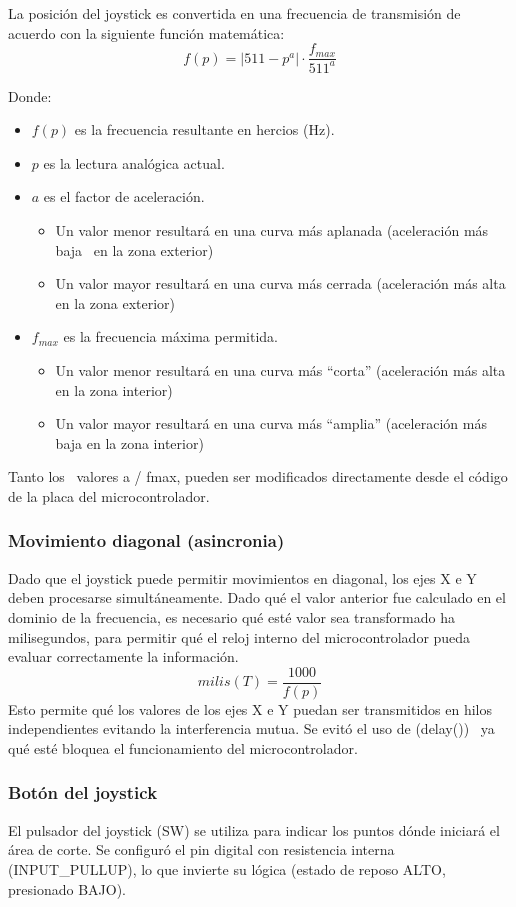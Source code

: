 \documentclass[conference]{IEEEtran}
\begin{document}
    
La posición del joystick es convertida en una frecuencia de transmisión de acuerdo con la siguiente función matemática:
$$f(p) = |511 - p^a| \cdot \frac{f_{max}}{511^a} $$

Donde:
\begin{itemize}
  \item $f(p)$ es la frecuencia resultante en hercios (Hz).
  \item $p$ es la lectura analógica actual.
  \item $a$ es el factor de aceleración.
    \begin{itemize}
      \item Un valor menor resultará en una curva más aplanada (aceleración más baja  en la zona exterior)
      \item Un valor mayor resultará en una curva más cerrada (aceleración más alta en la zona exterior)
    \end{itemize}
  \item $f_{max}$ es la frecuencia máxima permitida.
 \begin{itemize}
      \item Un valor menor resultará en una curva más ``corta'' (aceleración más alta en la zona interior)
      \item Un valor mayor resultará en una curva más ``amplia'' (aceleración más baja en la zona interior)
    \end{itemize}
  \end{itemize}

  Tanto los  valores a / fmax, pueden ser modificados directamente desde el código de la placa del microcontrolador. 

    \subsubsection{Movimiento diagonal (asincronia)}
    Dado que el joystick puede permitir movimientos en diagonal, los ejes X e Y deben procesarse simultáneamente. Dado qué el valor anterior fue calculado en el dominio de la frecuencia, es necesario qué esté valor sea transformado ha milisegundos, para permitir qué el reloj interno del microcontrolador pueda evaluar correctamente la información.
    $$milis(T) = \frac{1000}{f(p)}$$
    Esto permite qué los valores de los ejes X e Y puedan ser transmitidos en hilos independientes evitando la interferencia mutua. Se evitó el uso de (delay())  ya qué esté bloquea el funcionamiento del microcontrolador.

    \subsubsection{Botón del joystick}
    El pulsador del joystick (SW) se utiliza para indicar los puntos dónde iniciará el área de corte. Se configuró el pin digital con resistencia interna (INPUT\_PULLUP), lo que invierte su lógica (estado de reposo ALTO, presionado BAJO).
\end{document}
